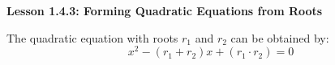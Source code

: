 \begin{center}
\textbf{Lesson 1.4.3: Forming Quadratic Equations from Roots}
\end{center}

\vspace*{1ex}

\noindent The quadratic equation with roots $r_1$ and $r_2$ can be obtained by:
$$ x^2 - (r_1 + r_2)x + (r_1 \cdot r_2) = 0 $$